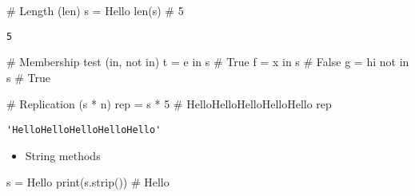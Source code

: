 \documentclass[
  letterpaper,
  DIV=11,
  numbers=noendperiod]{scrreprt}
\newenvironment{Shaded}{\begin{snugshade}}{\end{snugshade}}
\newcommand{\BuiltInTok}[1]{\textcolor[rgb]{0.00,0.46,0.62}{#1}}
\newcommand{\BuiltInTok}[1]{\textcolor[rgb]{0.00,0.48,0.65}{#1}}
\newcommand{\CommentTok}[1]{\textcolor[rgb]{0.37,0.37,0.37}{#1}}
\newcommand{\DecValTok}[1]{\textcolor[rgb]{0.68,0.00,0.00}{#1}}
\newcommand{\KeywordTok}[1]{\textcolor[rgb]{0.00,0.46,0.62}{#1}}
\newcommand{\NormalTok}[1]{\textcolor[rgb]{0.00,0.46,0.62}{#1}}
\newcommand{\OperatorTok}[1]{\textcolor[rgb]{0.37,0.37,0.37}{#1}}
\newcommand{\KeywordTok}[1]{\textcolor[rgb]{0.00,0.48,0.65}{#1}}
\newcommand{\NormalTok}[1]{\textcolor[rgb]{0.00,0.48,0.65}{#1}}
\newcommand{\OperatorTok}[1]{\textcolor[rgb]{0.37,0.37,0.37}{#1}}
\newcommand{\StringTok}[1]{\textcolor[rgb]{0.13,0.47,0.30}{#1}}
\providecommand{\tightlist}{%
  \setlength{\itemsep}{0pt}\setlength{\parskip}{0pt}}
\begin{document}
\begin{Shaded}
\begin{Highlighting}[]
\begin{Shaded}
\begin{Highlighting}[]
\CommentTok{\# Length (len)}
\NormalTok{s }\OperatorTok{=} \StringTok{\textquotesingle{}Hello\textquotesingle{}}
\BuiltInTok{len}\NormalTok{(s)                  }\CommentTok{\# 5}
\end{Highlighting}
\end{Shaded}

\begin{verbatim}
5
\end{verbatim}

\begin{Shaded}
\begin{Highlighting}[]

\CommentTok{\# Membership test (\textasciigrave{}in\textasciigrave{}, \textasciigrave{}not in\textasciigrave{})}
\NormalTok{t }\OperatorTok{=} \StringTok{\textquotesingle{}e\textquotesingle{}} \KeywordTok{in}\NormalTok{ s            }\CommentTok{\# True}
\NormalTok{f }\OperatorTok{=} \StringTok{\textquotesingle{}x\textquotesingle{}} \KeywordTok{in}\NormalTok{ s            }\CommentTok{\# False}
\NormalTok{g }\OperatorTok{=} \StringTok{\textquotesingle{}hi\textquotesingle{}} \KeywordTok{not} \KeywordTok{in}\NormalTok{ s       }\CommentTok{\# True}
\end{Highlighting}
\end{Shaded}

\begin{Shaded}
\begin{Highlighting}[]
\CommentTok{\# Replication (s * n)}
\NormalTok{rep }\OperatorTok{=}\NormalTok{ s }\OperatorTok{*} \DecValTok{5}             \CommentTok{\# \textquotesingle{}HelloHelloHelloHelloHello\textquotesingle{}}
\NormalTok{rep}
\end{Highlighting}
\end{Shaded}

\begin{verbatim}
'HelloHelloHelloHelloHello'
\end{verbatim}

\begin{itemize}
\tightlist
\item
  String methods
\end{itemize}

\begin{Shaded}
\begin{Highlighting}[]
\NormalTok{s }\OperatorTok{=} \StringTok{\textquotesingle{}  Hello \textquotesingle{}}
\BuiltInTok{print}\NormalTok{(s.strip())     }\CommentTok{\# \textquotesingle{}Hello\textquotesingle{}}
\end{Highlighting}
\end{Shaded}


\end{Highlighting}
\end{Shaded}
\end{document}
